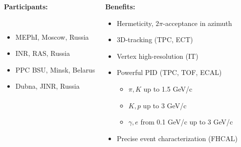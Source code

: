 \documentclass[dvipsnames] {beamer}
\begin{document}
\begin{frame}
\begin{columns}[t]
{\begin{block}{\bf \centering Participants:}
\begin{columns}[t]
                 \vskip -0.3cm
                 \begin{itemize}
                 \item MEPhI, Moscow, Russia 
                 \item INR, RAS, Russia
                 \item PPC BSU, Minsk, Belarus
                 \item Dubna, JINR, Russia
                 \end{itemize}           
               \end{columns}
             \end{block}
           }
           
                  {\tiny
                    \vskip -0.5cm
                    \begin{block}{\bf \centering Benefits:}
                      \begin{itemize}
                      \item Hermeticity, $2\pi$-acceptance in azimuth
                      \item 3D-tracking (TPC, ECT)
                      \item Vertex high-resolution (IT)
                      \item Powerful PID (TPC, TOF, ECAL)
                        \begin{itemize}
                        \item  {\tiny$\pi, K$ up to 1.5 GeV/c}
                        \item {\tiny$K, p$ up to 3 GeV/c}
                        \item {\tiny$\gamma, e$ from 0.1 GeV/c up to 3 GeV/c}
                        \end{itemize}
                      \item Precise event characterization (FHCAL)

\end{itemize}
\end{block}}
\end{columns}
\end{frame}
\end{document}
